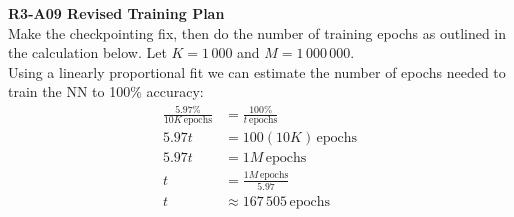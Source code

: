 \documentclass{article}
\begin{document}
	
	\begin{center}
		\textbf{R3-A09 Revised Training Plan}\\
		
		Make the checkpointing fix, then do the number of training epochs as outlined in the calculation below. Let $K = 1\,000$ and $M = 1\,000\,000$.\\
		
		Using a linearly proportional fit we can estimate the number of epochs needed to train the NN to 100\% accuracy:\\
		\begin{align*}
			\frac{5.97\%}{10K \, \text{epochs}} &= \frac{100\%}{t \, \text{epochs}}\\
			5.97t &= 100(10K) \, \text{epochs}\\
			5.97t &= 1M \, \text{epochs}\\
			t &= \frac{1M \, \text{epochs}}{5.97}\\
			t &\approx \boxed{167\,505 \, \text{epochs}}
		\end{align*}
		
		
	\end{center}
\end{document}
